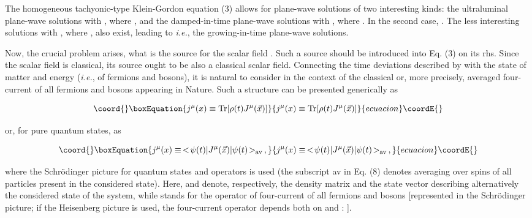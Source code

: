 \documentclass[a4paper,12pt]{article}
\begin{document}
The homogeneous tachyonic-type Klein-Gordon equation (3) allows for plane-wave solutions \coordHE{} of two interesting kinds: the ultraluminal plane-wave solutions with \coordHE{}, where \coordHE{}, and the damped-in-time plane-wave solutions with \coordHE{}, where \coordHE{}. In the second case, \coordHE{}. The less interesting solutions with \coordHE{}, where \coordHE{}, also exist, leading to \coordHE{} {\it i.e.}, the growing-in-time plane-wave solutions.

Now, the crucial problem arises, what is the source for the scalar field \coordHE{}. Such a source should be introduced into Eq. (3) on its rhs. Since the scalar field \coordHE{} is classical, its source ought to be also a classical scalar field. Connecting the time deviations described by \coordHE{} with the state of matter and energy ({\it i.e.}, of fermions and bosons), it is natural to consider in the context of \coordHE{} the classical or, more precisely, averaged four-current \coordHE{} of all fermions and bosons appearing in Nature. Such a structure can be presented generically as

\begin{equation}\coord{}\boxEquation{
j^\mu (x) \equiv {\rm Tr}[\rho(t) J^\mu(\vec{x})]
}{
j^\mu (x) \equiv {\rm Tr}[\rho(t) J^\mu(\vec{x})]
}{ecuacion}\coordE{}\end{equation}

\ni or, for pure quantum states, as

\begin{equation}\coord{}\boxEquation{
j^\mu (x) \equiv \,<\!\psi(t) | J^\mu(\vec{x}) | \psi(t)\!>_{\rm av}\,,
}{
j^\mu (x) \equiv \,<\!\psi(t) | J^\mu(\vec{x}) | \psi(t)\!>_{\rm av}\,,
}{ecuacion}\coordE{}\end{equation}

\ni where the Schr\"{o}dinger picture for quantum states and operators is used (the subscript av in Eq. (8) denotes averaging over spins of all particles present in the considered state). Here, \coordHE{} and \coordHE{} denote, respectively, the density matrix and the state vector describing alternatively the considered state of the system, while \coordHE{} stands for the operator of four-current of all fermions and bosons [represented in the Schr\"{o}dinger picture; if the Heisenberg picture is used, the four-current operator depends both on \coordHE{} and \coordHE{}: \coordHE{}].
\end{document}
